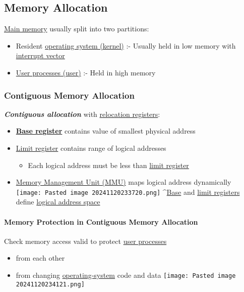 \subsection*{Memory Allocation}

\ul{Main memory} usually split into two partitions:

\begin{itemize}
\tightlist
\item
  Resident \ul{operating system (kernel)} :- Usually held in low memory
  with \ul{interrupt vector}
\item
  \ul{User processes (user)} :- Held in high memory
\end{itemize}

\subsubsection*{Contiguous Memory Allocation}

\textbf{\textit{Contiguous allocation}} with \ul{relocation registers}:

\begin{itemize}
\tightlist
\item
  \textbf{\ul{Base register}} contains value of smallest physical
  address
\item
  \ul{Limit register} contains range of logical addresses

  \begin{itemize}
  \tightlist
  \item
    Each logical address must be less than \ul{limit register}
  \end{itemize}
\item
  \ul{Memory Management Unit (MMU)} maps logical address dynamically
  \texttt{[image: Pasted image 20241120233720.png]} \^{}\ul{Base} and
  \ul{limit registers} define \ul{logical address space}
\end{itemize}

\paragraph*{Memory Protection in Contiguous Memory Allocation}

Check memory access valid to protect \ul{user processes}

\begin{itemize}
\tightlist
\item
  from each other
\item
  from changing \ul{operating-system} code and data
  \texttt{[image: Pasted image 20241120234121.png]}
\end{itemize}

